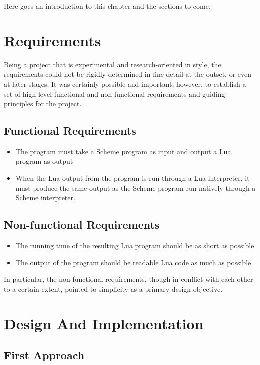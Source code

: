 Here goes an introduction to this chapter and the sections to come.


\section{Requirements}

Being a project that is experimental and research-oriented in style, the
requirements could not be rigidly determined in fine detail at the outset, or
even at later stages. It was certainly possible and important, however, to
establish a set of high-level functional and non-functional requirements and 
guiding principles for the project.

\subsection{Functional Requirements}

\begin{itemize}
\item The program must take a Scheme program as input and output a Lua program
as output
\item When the Lua output from the program is run through a Lua interpreter, it
must produce the same output as the Scheme program run natively through a Scheme
interpreter.
\end{itemize}

\subsection{Non-functional Requirements}

\begin{itemize}
\item The running time of the resulting Lua program should be as short as
possible
\item The output of the program should be readable Lua code as much as possible
\end{itemize}

In particular, the non-functional requirements, though in conflict with each
other to a certain extent, pointed to simplicity as a primary design objective.

\section{Design And Implementation}

\subsection{First Approach}

